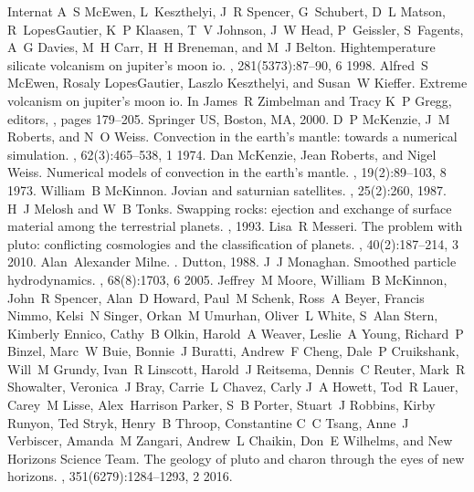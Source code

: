 \documentclass[letterpaper,10pt,english]{jupyterBook}
\begin{document}
\begin{sphinxthebibliography}{Internat}
\sphinxAtStartPar
A S McEwen, L Keszthelyi, J R Spencer, G Schubert, D L Matson, R Lopes\sphinxhyphen{}Gautier, K P Klaasen, T V Johnson, J W Head, P Geissler, S Fagents, A G Davies, M H Carr, H H Breneman, and M J Belton. High\sphinxhyphen{}temperature silicate volcanism on jupiter's moon io. , 281(5373):87–90, 6 1998.
\sphinxAtStartPar
Alfred S McEwen, Rosaly Lopes\sphinxhyphen{}Gautier, Laszlo Keszthelyi, and Susan W Kieffer. Extreme volcanism on jupiter's moon io. In James R Zimbelman and Tracy K P Gregg, editors, , pages 179–205. Springer US, Boston, MA, 2000.
\sphinxAtStartPar
D P McKenzie, J M Roberts, and N O Weiss. Convection in the earth's mantle: towards a numerical simulation. , 62(3):465–538, 1 1974.
\sphinxAtStartPar
Dan McKenzie, Jean Roberts, and Nigel Weiss. Numerical models of convection in the earth's mantle. , 19(2):89–103, 8 1973.
\sphinxAtStartPar
William B McKinnon. Jovian and saturnian satellites. , 25(2):260, 1987.
\sphinxAtStartPar
H J Melosh and W B Tonks. Swapping rocks: ejection and exchange of surface material among the terrestrial planets. , 1993.
\sphinxAtStartPar
Lisa R Messeri. The problem with pluto: conflicting cosmologies and the classification of planets. , 40(2):187–214, 3 2010.
\sphinxAtStartPar
Alan Alexander Milne. . Dutton, 1988.
\sphinxAtStartPar
J J Monaghan. Smoothed particle hydrodynamics. , 68(8):1703, 6 2005.
\sphinxAtStartPar
Jeffrey M Moore, William B McKinnon, John R Spencer, Alan D Howard, Paul M Schenk, Ross A Beyer, Francis Nimmo, Kelsi N Singer, Orkan M Umurhan, Oliver L White, S Alan Stern, Kimberly Ennico, Cathy B Olkin, Harold A Weaver, Leslie A Young, Richard P Binzel, Marc W Buie, Bonnie J Buratti, Andrew F Cheng, Dale P Cruikshank, Will M Grundy, Ivan R Linscott, Harold J Reitsema, Dennis C Reuter, Mark R Showalter, Veronica J Bray, Carrie L Chavez, Carly J A Howett, Tod R Lauer, Carey M Lisse, Alex Harrison Parker, S B Porter, Stuart J Robbins, Kirby Runyon, Ted Stryk, Henry B Throop, Constantine C C Tsang, Anne J Verbiscer, Amanda M Zangari, Andrew L Chaikin, Don E Wilhelms, and New Horizons Science Team. The geology of pluto and charon through the eyes of new horizons. , 351(6279):1284–1293, 2 2016.

\end{sphinxthebibliography}
\end{document}
